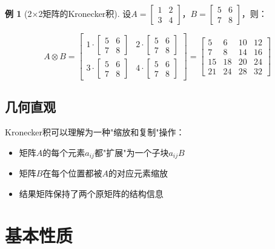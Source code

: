 \documentclass[11pt,a4paper]{ctexart}
\theoremstyle{definition}
\newtheorem{example}{例}[section]
\begin{document}
\begin{example}[2×2矩阵的Kronecker积]
设$A = \begin{bmatrix} 1 & 2 \\ 3 & 4 \end{bmatrix}$，$B = \begin{bmatrix} 5 & 6 \\ 7 & 8 \end{bmatrix}$，则：

$$A \otimes B = \begin{bmatrix}
1 \cdot \begin{bmatrix} 5 & 6 \\ 7 & 8 \end{bmatrix} & 2 \cdot \begin{bmatrix} 5 & 6 \\ 7 & 8 \end{bmatrix} \\[0.5em]
3 \cdot \begin{bmatrix} 5 & 6 \\ 7 & 8 \end{bmatrix} & 4 \cdot \begin{bmatrix} 5 & 6 \\ 7 & 8 \end{bmatrix}
\end{bmatrix} = \begin{bmatrix}
5 & 6 & 10 & 12 \\
7 & 8 & 14 & 16 \\
15 & 18 & 20 & 24 \\
21 & 24 & 28 & 32
\end{bmatrix}$$
\end{example}

\subsection{几何直观}

Kronecker积可以理解为一种"缩放和复制"操作：
\begin{itemize}
\item 矩阵$A$的每个元素$a_{ij}$都"扩展"为一个子块$a_{ij}B$
\item 矩阵$B$在每个位置都被$A$的对应元素缩放
\item 结果矩阵保持了两个原矩阵的结构信息
\end{itemize}

\section{基本性质}
\end{document}
